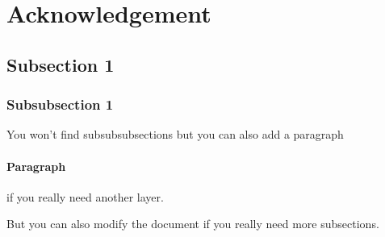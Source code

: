 \section{Acknowledgement}
\subsection{Subsection 1}
\subsubsection{Subsubsection 1}
You won't find subsubsubsections but you can also add a paragraph
\paragraph{Paragraph} 

if you really need another layer.

But you can also modify the document if you really need more subsections.
